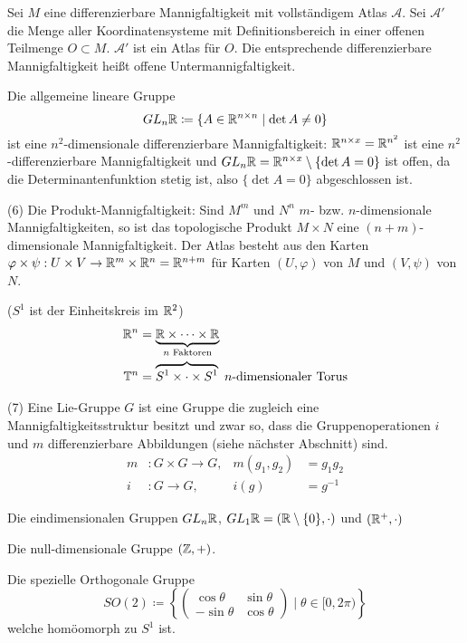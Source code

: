 \documentclass[a4paper,twoside,DIV15,BCOR12mm]{scrbook}
\newcommand{\At}{\mathcal A}
\renewcommand{\da}{\coloneqq}
\begin{document}
\begin{beispiele}
Sei $M$ eine differenzierbare Mannigfaltigkeit mit vollständigem Atlas $\At$. Sei $\At'$ die Menge aller Koordinatensysteme mit Definitionsbereich in einer offenen Teilmenge $O\subset M$. $\At'$ ist ein Atlas für $O$. Die entsprechende differenzierbare Mannigfaltigkeit heißt offene Untermannigfaltigkeit.

\begin{beispiel}
Die allgemeine lineare Gruppe
\[ GL_n\MdR \da \{ A \in \MdR^{n\times n} \mid \det A \ne 0 \} \]
ist eine $n^2$-dimensionale differenzierbare Mannigfaltigkeit:
$\mathbb{R}^{n\times x} = \mathbb{R}^{n^2}$ ist eine $n^2$-differenzierbare Mannigfaltigkeit und $GL_n\mathbb{R} = \mathbb{R}^{n\times x} \setminus \{\det A = 0\}$ ist offen, da die Determinantenfunktion stetig ist, also  $\{\det A = 0\}$ abgeschlossen ist.
\end{beispiel}

\item[(6)] Die Produkt-Mannigfaltigkeit:
Sind $M^m$ und $N^n$ $m$- bzw. $n$-dimensionale Mannigfaltigkeiten, so ist das topologische Produkt $M\times N$ eine $(n+m)$-dimensionale Mannigfaltigkeit. Der Atlas besteht aus den Karten $\varphi\times \psi: U\times V \to \mathbb{R}^m\times\mathbb{R}^n = \mathbb{R}^{n+m}$ für Karten $(U,\varphi)$ von $M$ und $(V,\psi)$ von $N$.

\begin{beispiel}
($S^1$ ist der Einheitskreis im $\mathbb{R}^2$)
\begin{align*}
\mathbb{R}^n &= \underbrace{\mathbb{R}\times \cdots \times \mathbb{R}}_{\text{$n$ Faktoren}} \\
\mathbb{T}^n &= \overbrace{S^1\times \cdot \times S^1} \text{ $n$-dimensionaler Torus}
\end{align*}
\end{beispiel}

\item[(7)] Eine Lie-Gruppe $G$ ist eine Gruppe die zugleich eine Mannigfaltigkeitsstruktur besitzt und zwar so, dass die Gruppenoperationen $i$ und $m$ differenzierbare Abbildungen (siehe nächster Abschnitt) sind. 
\begin{align*}
m&: G\times G \to G , &m(g_1,g_2) &= g_1g_2 \\
i&: G \to G , &i(g) &= g^{-1} 
\end{align*}
\begin{beispiele}
\item Die eindimensionalen Gruppen $GL_n\mathbb{R}$, $GL_1\mathbb{R} = (\mathbb{R}\setminus\{0\},\cdot)$ und  $(\mathbb{R}^+,\cdot)$ 
\item Die null-dimensionale Gruppe $(\mathbb{Z},+)$.
\item Die spezielle Orthogonale Gruppe 
\[ SO(2) \da \left\{
\begin{pmatrix}
\cos \theta & \sin \theta \\ -\sin \theta & \cos \theta \end{pmatrix} \mid \theta \in [0,2\pi) \right\} \]
welche homöomorph zu $S^1$ ist.


\end{beispiele}
\end{beispiele}
\end{document}
